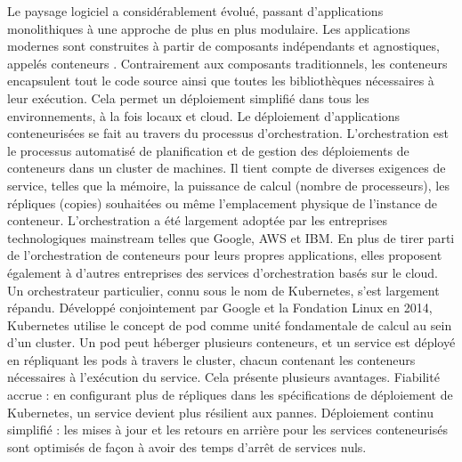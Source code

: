 
Le paysage logiciel a considérablement évolué, passant d’applications monolithiques à une approche de plus en plus modulaire. Les applications modernes sont construites à partir de composants indépendants et agnostiques, appelés conteneurs \cite{merkel2014docker}. Contrairement aux composants traditionnels, les conteneurs encapsulent tout le code source ainsi que toutes les bibliothèques nécessaires à leur exécution. Cela permet un déploiement simplifié dans tous les environnements, à la fois locaux et cloud. Le déploiement d’applications conteneurisées se fait au travers du processus d’orchestration. L’orchestration est le processus automatisé de planification et de gestion des déploiements de conteneurs dans un cluster de machines. Il tient compte de diverses exigences de service, telles que la mémoire, la puissance de calcul (nombre de processeurs), les répliques (copies) souhaitées ou même l’emplacement physique de l’instance de conteneur. L’orchestration a été largement adoptée par les entreprises technologiques mainstream telles que Google, AWS et IBM\cite{app12125793,awada2018application}. En plus de tirer parti de l’orchestration de conteneurs pour leurs propres applications, elles proposent également à d’autres entreprises des services d’orchestration basés sur le cloud.
Un orchestrateur particulier, connu sous le nom de Kubernetes\cite{7036275}, s’est largement répandu. Développé conjointement par Google et la Fondation Linux en 2014, Kubernetes utilise le concept de pod comme unité fondamentale de calcul au sein d’un cluster. Un pod peut héberger plusieurs conteneurs, et un service est déployé en répliquant les pods à travers le cluster, chacun contenant les conteneurs nécessaires à l’exécution du service. Cela présente plusieurs avantages. Fiabilité accrue : en configurant plus de répliques dans les spécifications de déploiement de Kubernetes, un service devient plus résilient aux pannes. Déploiement continu simplifié : les mises à jour et les retours en arrière pour les services conteneurisés sont optimisés de façon à avoir des temps d’arrêt de
services nuls.

